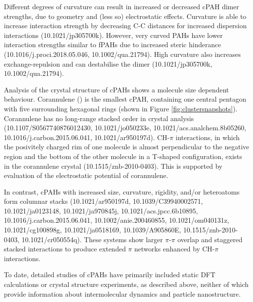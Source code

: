 Different degrees of curvature can result in increased or decreased cPAH dimer strengths, due to geometry and (less so) electrostatic effects. Curvature is able to increase interaction strength by decreasing C-C distances for increased dispersion interactions (10.1021/jp305700k). 
However, very curved PAHs have lower interaction strengths similar to fPAHs due to increased steric hinderance (10.1016/j.proci.2018.05.046, 10.1002/qua.21794). High curvature also increases exchange-repulsion and can destabilise the dimer (10.1021/jp305700k, 10.1002/qua.21794).


Analysis of the crystal structure of cPAHs shows a molecule size dependent behaviour. Corannulene () is the smallest cPAH, containing one central pentagon with five surrounding hexagonal rings (shown in Figure \ref{fig:clustersnapshots}). Corannulene has no long-range stacked order in crystal analysis (10.1107/S0567740876012430, 10.1021/jo050233e, 10.1021/acs.analchem.8b05260, 10.1016/j.carbon.2015.06.041, 10.1021/ar950197d). 
CH-$\pi$ interactions, in which the posivitely charged rim of one molecule is almost perpendicular to the negative region and the bottom of the other molecule in a T-shaped configuration, exists in the corannulene crystal (10.1515/znb-2010-0403). This is supported by evaluation of the electrostatic potential of corannulene.

In contrast, cPAHs with increased size, curvature, rigidity, and/or heteroatoms form columnar stacks (10.1021/ar950197d, 10.1039/C39940002571, 10.1021/ja0123148, 10.1021/ja970845j, 10.1021/acs.jpcc.6b10895, 10.1016/j.carbon.2015.06.041, 10.1002/anie.200460855, 10.1021/om040131z, 10.1021/cg100898g, 10.1021/ja0518169, 10.1039/A905860E, 10.1515/znb-2010-0403, 10.1021/cr050554q). These systems show larger $\pi$-$\pi$ overlap and staggered stacked interactions to produce extended $\pi$ networks enhanced by CH-$\pi$ interactions.


To date, detailed studies of cPAHs have primarily included static DFT calculations or crystal structure experiments, as described above, neither of which provide information about intermolecular dynamics and particle nanostructure.


